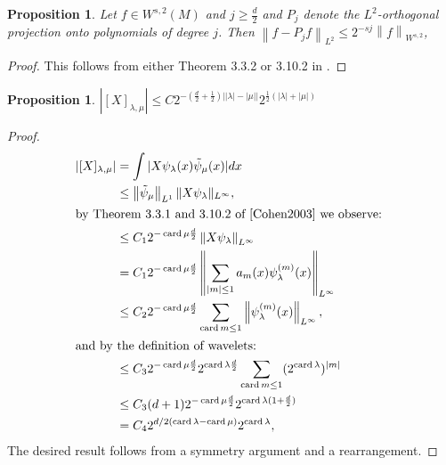 \documentclass[12pt]{amsart}
\newcommand{\norm}[1]{\ensuremath{\left\| #1 \right\| }}
\newcommand{\abs}[1]{\ensuremath{ | #1 | }}
\newtheorem{prop}[thm]{Proposition}
\DeclareMathOperator{\card}{card}
\begin{document}
\begin{prop} \label{prop:projection_bound}
	Let $f \in W^{s,2}(M)$ and $j \geq \frac{d}{2}$ and $P_j$ denote the $L^2$-orthogonal projection onto polynomials of degree $j$.
	Then $\norm{f - P_j f}_{L^2} \leq  2^{-sj}\norm{f}_{W^{s,2}}$,
\end{prop}
\begin{proof}
	This follows from either Theorem 3.3.2 or 3.10.2 in \cite{Cohen2003}.
\end{proof}

\begin{prop} \label{lem:matrix_bound}
	$\abs{[X]_{\lambda,\mu}} \leq C 2^{-(\frac{d}{2}+\frac{1}{2})\abs{\abs{\lambda}-\abs{\mu}}}2^{\frac{1}{2}(\abs{\lambda}+\abs{\mu})}$
\end{prop}
\begin{proof}
	\begin{align*}
		\abs{[X]_{\lambda,\mu}} 	&= \int \abs{X \psi_{\lambda}(x) \tilde{\psi}_{\mu}(x)} dx \\
								&\leq \norm{\tilde{\psi}_\mu}_{L^1} \| X \psi_\lambda \|_{L^\infty}, \\ %
							\intertext{by Theorem 3.3.1 and 3.10.2 of \cite{Cohen2003} we observe: }
								&\leq C_1 2^{-\card{\mu}\frac{d}{2}}\norm{X\psi_{\lambda}}_{L^{\infty}} \\
								&= C_1 2^{-\card{\mu}\frac{d}{2}}\norm{ \sum_{\abs{m} \leq 1 } a_m(x) \psi^{(m)}_\lambda(x) }_{L^{\infty}} \\
								&\leq C_2 2^{-\card{\mu}\frac{d}{2}}\sum_{\card{m}\leq 1}\norm{\psi_{\lambda}^{(m)}(x)}_{L^{\infty}} , \\
							\intertext{and by the definition of wavelets:}
								&\leq C_3 2^{-\card{\mu}\frac{d}{2}} 2^{\card{\lambda}\frac{d}{2}} \sum_{\card{m}\leq 1} (2^{\card{\lambda}})^{\abs{m}} \\
								&\leq C_3 (d+1) 2^{-\card{\mu}\frac{d}{2}} 2^{\card{\lambda}(1+\frac{d}{2})} \\
								&= C_4 2^{d/2(\card{\lambda} - \card{\mu})}2^{\card{\lambda}},
	\end{align*}
	The desired result follows from a symmetry argument and a rearrangement.
\end{proof}
\end{document}
